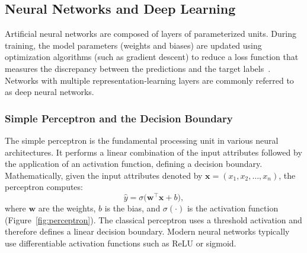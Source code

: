 \documentclass[Ingles]{ic-tese-v3}
\begin{document}
\subsection{Neural Networks and Deep Learning}

Artificial neural networks are composed of layers of parameterized units. During training, the model parameters (weights and biases) are updated using optimization algorithms (such as gradient descent) to reduce a loss function that measures the discrepancy between the predictions and the target labels~\cite{goodfellow2016deep}. Networks with multiple representation-learning layers are commonly referred to as deep neural networks.

\subsubsection{Simple Perceptron and the Decision Boundary}

The simple perceptron is the fundamental processing unit in various neural architectures. It performs a linear combination of the input attributes followed by the application of an activation function, defining a decision boundary. Mathematically, given the input attributes denoted by \(\mathbf{x} = (x_1, x_2, \ldots, x_n)\), the perceptron computes:
\begin{equation*}
\hat{y} = \sigma\bigl(\mathbf{w}^\top \mathbf{x} + b\bigr),
\end{equation*}
\noindent where \(\mathbf{w}\) are the weights, \(b\) is the bias, and \(\sigma(\cdot)\) is the activation function (Figure~\ref{fig:perceptron}). The classical perceptron uses a threshold activation and therefore defines a linear decision boundary. Modern neural networks typically use differentiable activation functions such as ReLU or sigmoid.
\end{document}
